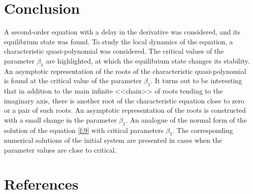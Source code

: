 \documentclass[12pt]{article} %
\begin{document}
\section*{Conclusion}
A second-order equation with a delay in the derivative was considered, and its equilibrium state was found. To study the local dynamics of the equation, a characteristic quasi-polynomial was considered. The critical values of the parameter \(\beta_1\) are highlighted, at which the equilibrium state changes its stability. An asymptotic representation of the roots of the characteristic quasi-polynomial is found at the critical value of the parameter \(\beta_1\). It turns out to be interesting that in addition to the main infinite <<chain>> of roots tending to the imaginary axis, there is another root of the characteristic equation close to zero or a pair of such roots. An asymptotic representation of the roots is constructed with a small change in the parameter \(\beta_1\). An analogue of the normal form of the solution of the equation \eqref{f:9} with critical parameters \(\beta_1\). The corresponding numerical solutions of the initial system are presented in cases when the parameter values are close to critical.

\newpage
{}
\section*{References}
\end{document}

